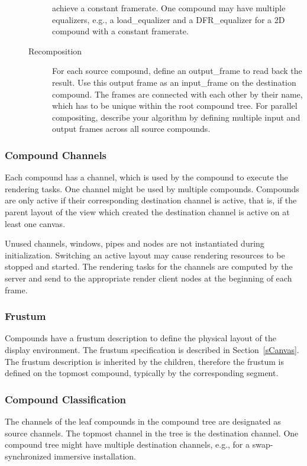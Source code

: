 \documentclass[10pt,a4]{scrartcl}
\newcommand{\sref}[1]{Section~\ref{#1}}
\begin{document}
\begin{description}
\begin{description}
    achieve a constant framerate. One compound may have multiple
    equalizers, e.g., a \textsf{load\_equalizer} and a
    \textsf{DFR\_equalizer} for a 2D compound with a constant framerate.
  \item[Recomposition] For each source compound, define an
    \textsf{output\_frame} to read back the result. Use this output frame
    as an \textsf{input\_frame} on the destination compound. The frames
    are connected with each other by their name, which has to be unique
    within the root compound tree. For parallel compositing, describe
    your algorithm by defining multiple input and output frames across
    all source compounds.
  \end{description}
\end{description}

\subsubsection{Compound Channels}
Each compound has a channel, which is used by the compound to execute the
rendering tasks. One channel might be used by multiple compounds. Compounds are
only active if their corresponding destination channel is active, that is, if
the parent layout of the view which created the destination channel is active on
at least one canvas.

Unused channels, windows, pipes and nodes are not instantiated during
initialization.  Switching an active layout may cause rendering resources to be
stopped and started. The rendering tasks for the channels are computed by the
server and send to the appropriate render client nodes at the beginning of each
frame.

\subsubsection{\label{sFrustum}Frustum}

Compounds have a frustum description to define the physical layout of the
display environment. The frustum specification is described in
\sref{sCanvas}. The frustum description is inherited by the children, therefore
the frustum is defined on the topmost compound, typically by the corresponding
segment.

\subsubsection{Compound Classification}
The channels of the leaf compounds in the compound tree are designated
as source channels. The topmost channel in the tree is the destination
channel. One compound tree might have multiple destination channels,
e.g., for a swap-synchronized immersive installation. 
\end{document}
